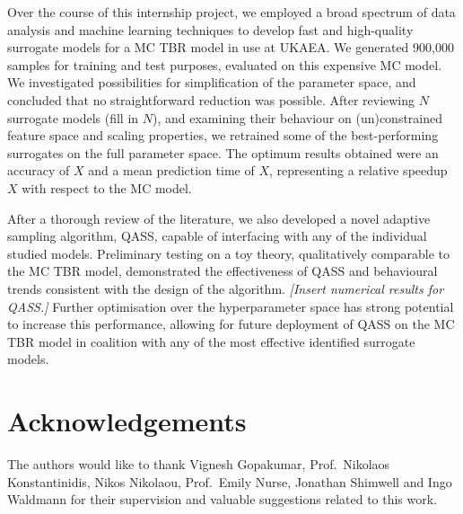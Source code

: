Over the course of this internship project, we employed a broad spectrum of data analysis and machine learning techniques to develop fast and high-quality surrogate models for a MC TBR model in use at UKAEA. We generated 900,000 samples for training and test purposes, evaluated on this expensive MC model. We investigated possibilities for simplification of the parameter space, and concluded that no straightforward reduction was possible. After reviewing $N$ surrogate models (fill in $N$), and examining their behaviour on (un)constrained feature space and scaling properties, we retrained some of the best-performing surrogates on the full parameter space. The optimum results obtained were an accuracy of $X$ and a mean prediction time of $X$, representing a relative speedup $X$ with respect to the MC model.

After a thorough review of the literature, we also developed a novel adaptive sampling algorithm, QASS, capable of interfacing with any of the individual studied models. Preliminary testing on a toy theory, qualitatively comparable to the MC TBR model, demonstrated the effectiveness of QASS and behavioural trends consistent with the design of the algorithm. \textit{[Insert numerical results for QASS.]} Further optimisation over the hyperparameter space has strong potential to increase this performance, allowing for future deployment of QASS on the MC TBR model in coalition with any of the most effective identified surrogate models.


\section*{Acknowledgements}

The authors would like to thank Vignesh Gopakumar, Prof.~Nikolaos
Konstantinidis, Nikos Nikolaou, Prof.~Emily Nurse, Jonathan Shimwell and Ingo
Waldmann for their supervision and valuable suggestions related to this work.

